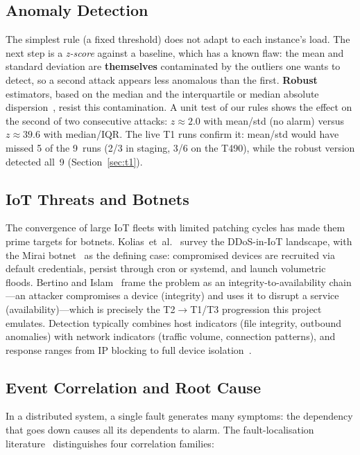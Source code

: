 \documentclass[11pt,a4paper]{article}
\begin{document}
\subsection{Anomaly Detection}

The simplest rule (a fixed threshold) does not adapt to each instance's load. The next step
is a \emph{z-score} against a baseline, which has a known flaw: the mean and standard
deviation are \textbf{themselves} contaminated by the outliers one wants to detect, so a
second attack appears less anomalous than the first. \textbf{Robust} estimators, based on the
median and the interquartile or median absolute dispersion~\cite{iglewicz1993}, resist this
contamination. A unit test of our rules shows the effect on the second of two consecutive
attacks: $z \approx 2.0$ with mean/std (no alarm) versus $z \approx 39.6$ with median/IQR.
The live T1 runs confirm it: mean/std would have missed 5 of the 9~runs (2/3 in staging,
3/6 on the T490), while the robust version detected all~9 (Section~\ref{sec:t1}).

\subsection{IoT Threats and Botnets}

The convergence of large IoT fleets with limited patching cycles has made them prime targets
for botnets. Kolias~et~al.~\cite{kolias2017} survey the DDoS-in-IoT landscape, with the
Mirai botnet~\cite{antonakakis2017} as the defining case: compromised devices are recruited
via default credentials, persist through cron or systemd, and launch volumetric floods.
Bertino and Islam~\cite{bertino2017} frame the problem as an integrity-to-availability
chain---an attacker compromises a device (integrity) and uses it to disrupt a service
(availability)---which is precisely the T2$\to$T1/T3 progression this project
emulates. Detection typically combines host indicators (file integrity, outbound anomalies)
with network indicators (traffic volume, connection patterns), and response ranges from IP
blocking to full device isolation~\cite{scarfone2007}.

\subsection{Event Correlation and Root Cause}

In a distributed system, a single fault generates many symptoms: the dependency that goes
down causes all its dependents to alarm. The fault-localisation
literature~\cite{steinder2004} distinguishes four correlation families:
\end{document}
